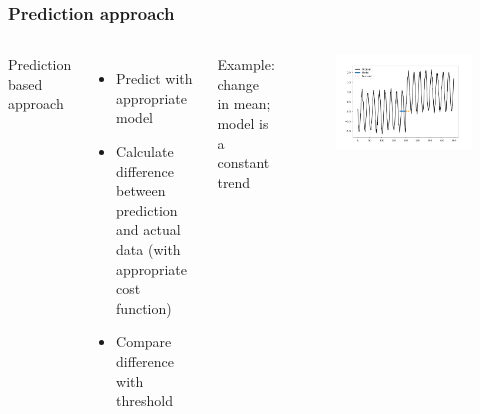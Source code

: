 \documentclass[intlimits, 9pt, unicode]{beamer}
\begin{document}
\begin{frame}
    \frametitle{Prediction approach}
  \begin{columns}[T,onlytextwidth]
	Prediction based approach
	    \begin{itemize}
	    	\item Predict with appropriate model
		\item Calculate difference between prediction and actual data (with appropriate cost function)
		\item Compare difference with threshold
	    \end{itemize}
      Example: change in mean; model is a constant trend
      \begin{figure}
	\includegraphics[scale=0.2]{images/approaches_first_3}
	\end{figure}
     \end{columns}
\end{frame}
\end{document}

